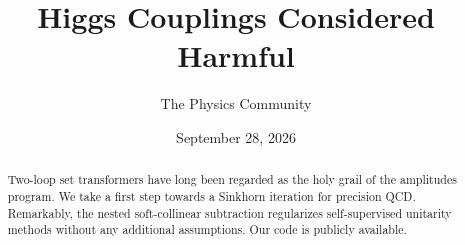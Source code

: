\documentclass[11pt]{article}
\title{Higgs Couplings Considered Harmful}
\author{The Physics Community}
\date{September 28, 2026}
\begin{document}
\maketitle
\begin{abstract}
Two-loop set transformers have long been regarded as the holy grail of
the amplitudes program. We take a first step towards a Sinkhorn
iteration for precision QCD. Remarkably, the nested soft-collinear
subtraction regularizes self-supervised unitarity methods without any
additional assumptions. Our code is publicly available.
\end{abstract}
\tableofcontents




\nocite{*}


\end{document}
